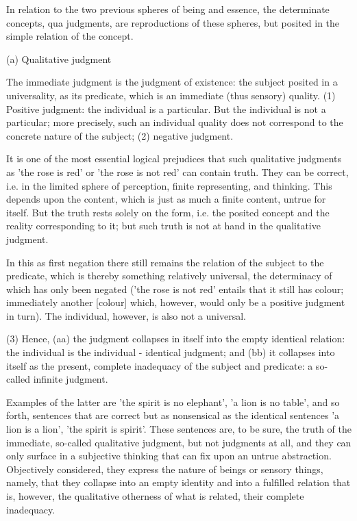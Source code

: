 In relation to the two previous spheres of being and essence,
the determinate concepts, qua judgments, are reproductions of
these spheres, but posited in the simple relation of the concept.

(a) Qualitative judgment

The immediate judgment is the judgment of existence:
the subject posited in a universality, as its predicate,
which is an immediate (thus sensory) quality.
(1) Positive judgment: the individual is a particular.
But the individual is not a particular;
more precisely, such an individual quality
does not correspond to the concrete nature of the subject;
(2) negative judgment.

It is one of the most essential logical prejudices
that such qualitative judgments as 'the rose is red'
or 'the rose is not red' can contain truth.
They can be correct, i.e. in the limited sphere of
perception, finite representing, and thinking.
This depends upon the content,
which is just as much a finite content,
untrue for itself.
But the truth rests solely on the form, i.e.
the posited concept
and the reality corresponding to it;
but such truth is not at hand in the qualitative judgment.

In this as first negation there still remains
the relation of the subject to the predicate,
which is thereby something relatively universal,
the determinacy of which has only been negated
('the rose is not red' entails that it still has colour;
immediately another [colour] which, however,
would only be a positive judgment in turn).
The individual, however, is also not a universal.

(3) Hence,
(aa) the judgment collapses in itself
into the empty identical relation:
the individual is the individual - identical judgment;
and (bb) it collapses into itself as the present,
complete inadequacy of the subject and predicate:
a so-called infinite judgment.

Examples of the latter are
'the spirit is no elephant',
'a lion is no table',
and so forth,
sentences that are correct
but as nonsensical as the identical sentences
'a lion is a lion',
'the spirit is spirit'.
These sentences are, to be sure,
the truth of the immediate,
so-called qualitative judgment,
but not judgments at all,
and they can only surface in a subjective thinking
that can fix upon an untrue abstraction.
Objectively considered, they express
the nature of beings
or sensory things, namely,
that they collapse into an empty identity
and into a fulfilled relation that is, however,
the qualitative otherness of what is related,
their complete inadequacy.

